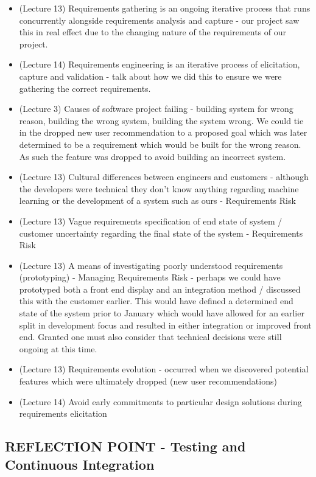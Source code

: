 \documentclass{l3proj}
\begin{document}
\begin{itemize}
\item (Lecture 13) Requirements gathering is an ongoing iterative process that runs concurrently alongside requirements analysis and capture - our project saw this in real effect due to the changing nature of the requirements of our project.
\item (Lecture 14) Requirements engineering is an iterative process of elicitation, capture and validation - talk about how we did this to ensure we were gathering the correct requirements.
\item (Lecture 3) Causes of software project failing - building system for wrong reason, building the wrong system, building the system wrong. We could tie in the dropped new user recommendation to a proposed goal which was later determined to be a requirement which would be built for the wrong reason. As such the feature was dropped to avoid building an incorrect system.
\item (Lecture 13) Cultural differences between engineers and customers - although the developers were technical they don’t know anything regarding machine learning or the development of a system such as ours - Requirements Risk
\item (Lecture 13) Vague requirements specification of end state of system / customer uncertainty regarding the final state of the system - Requirements Risk
\item (Lecture 13) A means of investigating poorly understood requirements (prototyping) - Managing Requirements Risk - perhaps we could have prototyped both a front end display and an integration method / discussed this with the customer earlier. This would have defined a determined end state of the system prior to January which would have allowed for an earlier split in development focus and resulted in either integration or improved front end. Granted one must also consider that technical decisions were still ongoing at this time.
\item (Lecture 13) Requirements evolution - occurred when we discovered potential features which were ultimately dropped (new user recommendations)
\item (Lecture 14) Avoid early commitments to particular design solutions during requirements elicitation
\end{itemize}


\subsection{REFLECTION POINT - Testing and Continuous Integration}
\label{testing}
\end{document}
